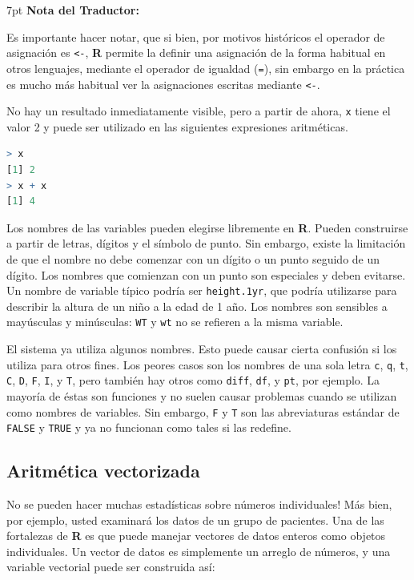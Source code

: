 \documentclass[spanish]{extbook}
\newenvironment{tradnote}{%
  \def\FrameCommand{%
    \hspace{1pt}%
    {\color{darkblue}\vrule width 2pt}%
    {\color{formalshade}\vrule width 4pt}%
    \colorbox{formalshade}%
  }%
  \vspace{12pt}
  \MakeFramed{\advance\hsize-\width\FrameRestore}%
  \noindent\hspace{-4.55pt}%
  \begin{adjustwidth}{}{7pt}%
  \vspace{1pt}%
  \textbf{Nota del Traductor:\\}%
}
{%
  \vspace{6pt}\end{adjustwidth}\endMakeFramed%
}
\numberwithin{equation}{section}
\numberwithin{figure}{section}
\begin{document}
\begin{tradnote}
	Es importante hacer notar, que si bien, por motivos históricos
	el operador de asignación es \texttt{<-}, \textbf{R} permite la definir una asignación
	de la forma habitual en otros lenguajes, mediante el operador de igualdad (\texttt{=}),
	sin embargo en la práctica es mucho más habitual ver la asignaciones
	escritas mediante \texttt{<-}.
\end{tradnote} 

No hay un resultado inmediatamente visible, pero a partir de ahora,
\texttt{x} tiene el valor 2 y puede ser utilizado en las siguientes
expresiones aritméticas.

\begin{lstlisting}[language=R]
> x 
[1] 2 
> x + x 
[1] 4
\end{lstlisting}

Los nombres de las variables pueden elegirse libremente en \textbf{R}.  Pueden
construirse a partir de letras, dígitos y el símbolo de punto.  Sin embargo,
existe la limitación de que el nombre no debe comenzar con un dígito o un punto
seguido de un dígito. Los nombres que comienzan con un punto son especiales y
deben evitarse. Un nombre de variable típico podría ser \texttt{height.1yr},
que podría utilizarse para describir la altura de un niño a la edad de 1 año.
Los nombres son sensibles a mayúsculas y minúsculas: \texttt{WT} y \texttt{wt}
no se refieren a la misma variable.

El sistema ya utiliza algunos nombres. Esto puede causar cierta confusión si
los utiliza para otros fines. Los peores casos son los nombres de una sola
letra \texttt{c}, \texttt{q}, \texttt{t}, \texttt{C}, \texttt{D}, \texttt{F},
\texttt{I}, y \texttt{T}, pero también hay otros como \texttt{diff},
\texttt{df}, y \texttt{pt}, por ejemplo.  La mayoría de éstas son funciones y
no suelen causar problemas cuando se utilizan como nombres de variables. Sin
embargo, \texttt{F} y \texttt{T} son las abreviaturas estándar de
\texttt{FALSE} y \texttt{TRUE} y ya no funcionan como tales si las redefine.

\subsection{Aritmética vectorizada}

No se pueden hacer muchas estadísticas sobre números individuales!  Más bien,
por ejemplo, usted examinará los datos de un grupo de pacientes.  Una de las
fortalezas de \textbf{R} es que puede manejar vectores de datos enteros como
objetos individuales.  Un vector de datos es simplemente un arreglo de números,
y una variable vectorial puede ser construida así:
\end{document}
